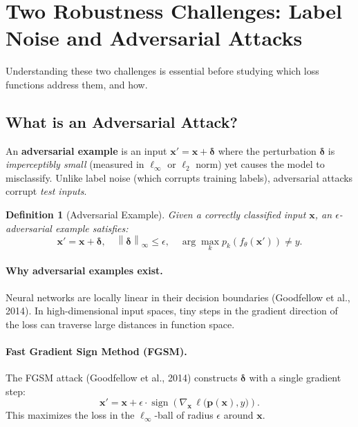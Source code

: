 \documentclass[11pt,a4paper]{article}
\newtheorem{definition}[theorem]{Definition}
\newcommand{\sign}{\operatorname{sign}}
\newcommand{\norm}[1]{\left\|#1\right\|}
\newcommand{\pb}{\mathbf{p}}
\newcommand{\xb}{\mathbf{x}}
\begin{document}
\section{Two Robustness Challenges: Label Noise and Adversarial Attacks}
\label{sec:challenges}

Understanding these two challenges is essential before studying which loss functions
address them, and how.

\subsection{What is an Adversarial Attack?}
\label{sec:adversarial}

An \textbf{adversarial example} is an input $\xb' = \xb + \boldsymbol{\delta}$ where the perturbation
$\boldsymbol{\delta}$ is \emph{imperceptibly small} (measured in $\ell_\infty$ or $\ell_2$ norm) yet
causes the model to misclassify. Unlike label noise (which corrupts training labels),
adversarial attacks corrupt \emph{test inputs}.

\begin{definition}[Adversarial Example]
Given a correctly classified input $\xb$, an $\epsilon$-adversarial example satisfies:
\[
  \xb' = \xb + \boldsymbol{\delta}, \quad \norm{\boldsymbol{\delta}}_\infty \leq \epsilon, \quad
  \arg\max_k p_k(f_\theta(\xb')) \neq y.
\]
\end{definition}

\paragraph{Why adversarial examples exist.}
Neural networks are locally linear in their decision boundaries (Goodfellow et al., 2014).
In high-dimensional input spaces, tiny steps in the gradient direction of the loss can
traverse large distances in function space.

\paragraph{Fast Gradient Sign Method (FGSM).}
The FGSM attack (Goodfellow et al., 2014) constructs $\boldsymbol{\delta}$ with a single gradient step:
\begin{equation}
  \label{eq:fgsm}
  \xb' = \xb + \epsilon \cdot \sign\!\left(\nabla_{\xb}\, \ell\big(\pb(\xb), y\big)\right).
\end{equation}
This maximizes the loss in the $\ell_\infty$-ball of radius $\epsilon$ around $\xb$.
\end{document}
